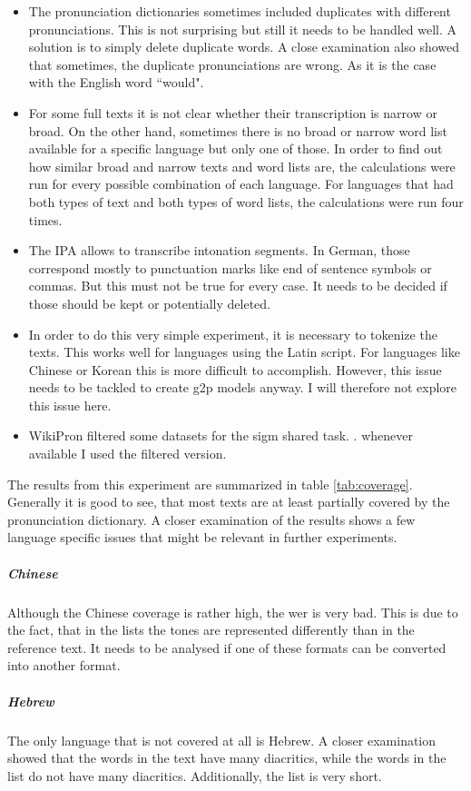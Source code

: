 \begin{itemize}
\item The pronunciation dictionaries sometimes included duplicates with different pronunciations. This is not surprising but still it needs to be handled well. A solution is to simply delete duplicate words. A close examination also showed that sometimes, the duplicate pronunciations are wrong. As it is the case with the English word ``would". 
\item For some full texts it is not clear whether their transcription is narrow or broad. On the other hand, sometimes there is no broad or narrow word list available for a specific language but only one of those. In order to find out how similar broad and narrow texts and word lists are, the calculations were run for every possible combination of each language. For languages that had both types of text and both types of word lists, the calculations were run four times. 
\item The IPA allows to transcribe intonation segments. In German, those correspond mostly to punctuation marks like end of sentence symbols or commas. But this must not be true for every case. It needs to be decided if those should be kept or potentially deleted.
\item In order to do this very simple experiment, it is necessary to tokenize the texts. This works well for languages using the Latin script. For languages like Chinese or Korean this is more difficult to accomplish. However, this issue needs to be tackled to create \ac{g2p} models anyway. I will therefore not explore this issue here.
\item WikiPron filtered some datasets for the \ac{sigm} shared task. . whenever available I used the filtered version.
\end{itemize}

The results from this experiment are summarized in table \ref{tab:coverage}. Generally it is good to see, that most texts are at least partially covered by the pronunciation dictionary. A closer examination of the results shows a few language specific issues that might be relevant in further experiments.


\subparagraph{Chinese} Although the Chinese coverage is rather high, the \ac{wer} is very bad. This is due to the fact, that in the lists the tones are represented differently than in the reference text. It needs to be analysed if one of these formats can be converted into another format. 
\subparagraph{Hebrew} The only language that is not covered at all is Hebrew. A closer examination showed that the words in the text have many diacritics, while the words in the list do not have many diacritics. Additionally, the list is very short. 

